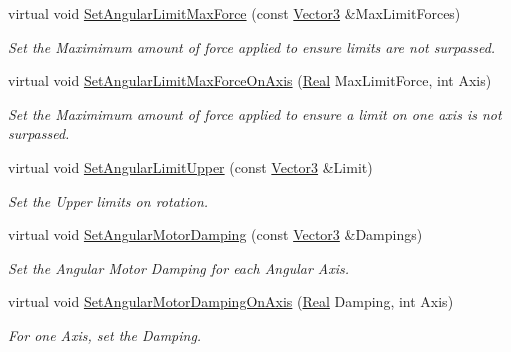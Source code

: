\begin{DoxyCompactItemize}
virtual void \hyperlink{classMezzanine_1_1Generic6DofConstraint_a6a0cc7ac577b855687b74583e5a23b08}{SetAngularLimitMaxForce} (const \hyperlink{classMezzanine_1_1Vector3}{Vector3} \&MaxLimitForces)
\begin{DoxyCompactList}\small\item\em Set the Maximimum amount of force applied to ensure limits are not surpassed. \item\end{DoxyCompactList}\item 
virtual void \hyperlink{classMezzanine_1_1Generic6DofConstraint_a899734922a915a2f2b22c9212f415c35}{SetAngularLimitMaxForceOnAxis} (\hyperlink{namespaceMezzanine_a726731b1a7df72bf3583e4a97282c6f6}{Real} MaxLimitForce, int Axis)
\begin{DoxyCompactList}\small\item\em Set the Maximimum amount of force applied to ensure a limit on one axis is not surpassed. \item\end{DoxyCompactList}\item 
virtual void \hyperlink{classMezzanine_1_1Generic6DofConstraint_a3bdd15929ecddb818db7fea8cfdb2fe0}{SetAngularLimitUpper} (const \hyperlink{classMezzanine_1_1Vector3}{Vector3} \&Limit)
\begin{DoxyCompactList}\small\item\em Set the Upper limits on rotation. \item\end{DoxyCompactList}\item 
virtual void \hyperlink{classMezzanine_1_1Generic6DofConstraint_ab386bb86b026ab9c1e8709b037cd9875}{SetAngularMotorDamping} (const \hyperlink{classMezzanine_1_1Vector3}{Vector3} \&Dampings)
\begin{DoxyCompactList}\small\item\em Set the Angular Motor Damping for each Angular Axis. \item\end{DoxyCompactList}\item 
virtual void \hyperlink{classMezzanine_1_1Generic6DofConstraint_a42c561134495de588cf16d7d46f1fea3}{SetAngularMotorDampingOnAxis} (\hyperlink{namespaceMezzanine_a726731b1a7df72bf3583e4a97282c6f6}{Real} Damping, int Axis)
\begin{DoxyCompactList}\small\item\em For one Axis, set the Damping. \item\end{DoxyCompactList}\item 

\end{DoxyCompactItemize}
